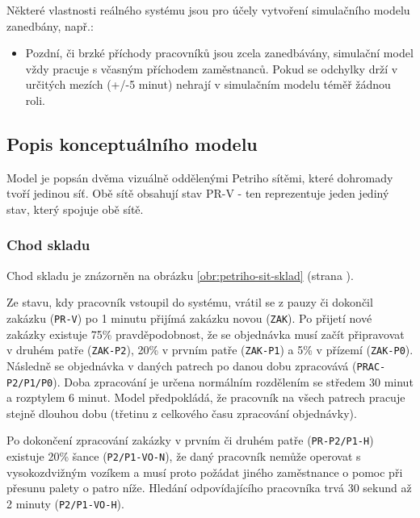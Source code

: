 \documentclass[11pt]{article}
\begin{document}
	
	Některé vlastnosti reálného systému jsou pro účely vytvoření simulačního modelu zanedbány, např.:
	\begin{itemize}
		\item Pozdní, či brzké příchody pracovníků jsou zcela zanedbávány, simulační model vždy pracuje s včasným příchodem zaměstnanců.
		Pokud se odchylky drží v určitých mezích (+/-5 minut) nehrají v simulačním modelu téměř žádnou roli.
	\end{itemize}
	
	\subsection{Popis konceptuálního modelu}
	Model je popsán dvěma vizuálně oddělenými Petriho sítěmi, které dohromady tvoří jedinou síť.
	Obě sítě obsahují stav \textsf{PR-V} - ten reprezentuje jeden jediný stav, který spojuje obě sítě.
	
	\subsubsection{Chod skladu}
	Chod skladu je znázorněn na obrázku \ref{obr:petriho-sit-sklad} (strana \pageref{obr:petriho-sit-sklad}).
	
	Ze stavu, kdy pracovník vstoupil do systému, vrátil se z pauzy či dokončil zakázku (\texttt{PR-V}) po 1 minutu přijímá zakázku novou (\texttt{ZAK}).
	Po přijetí nové zakázky existuje 75\% pravděpodobnost, že se objednávka musí začít připravovat v druhém patře (\texttt{ZAK-P2}), 20\% v prvním patře (\texttt{ZAK-P1}) a 5\% v přízemí (\texttt{ZAK-P0}).
	Následně se objednávka v daných patrech po danou dobu zpracovává (\texttt{PRAC-P2/P1/P0}).
	Doba zpracování je určena normálním rozdělením se středem 30 minut a rozptylem 6 minut.
	Model předpokládá, že pracovník na všech patrech pracuje stejně dlouhou dobu (třetinu z celkového času zpracování objednávky).
	
	Po dokončení zpracování zakázky v prvním či druhém patře (\texttt{PR-P2/P1-H}) existuje 20\% šance (\texttt{P2/P1-VO-N}), že daný pracovník nemůže operovat s vysokozdvižným vozíkem a musí proto požádat jiného zaměstnance o pomoc při přesunu palety o patro níže.
	Hledání odpovídajícího pracovníka trvá 30 sekund až 2 minuty (\texttt{P2/P1-VO-H}).
	
\end{document}
